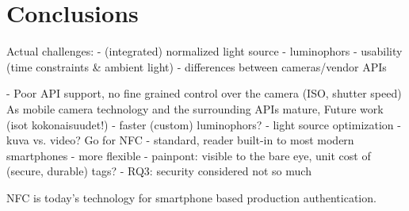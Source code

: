 \documentclass[thesis.tex]{subfiles}
\begin{document}
\chapter{Conclusions}
\label{chapter:conclusions}

Actual challenges:
- (integrated) normalized light source
- luminophors
- usability (time constraints \& ambient light)
- differences between cameras/vendor APIs

- Poor API support, no fine grained control over the camera (ISO, shutter speed)
As mobile camera technology and the surrounding APIs mature,
Future work (isot kokonaisuudet!)
  - faster (custom) luminophors?
  - light source optimization
  - kuva vs. video?
Go for NFC
- standard, reader built-in to most modern smartphones
- more flexible
- painpont: visible to the bare eye, unit cost of (secure, durable) tags?
- RQ3: security considered not so much

NFC is today's technology for smartphone based production authentication.
\end{document}
